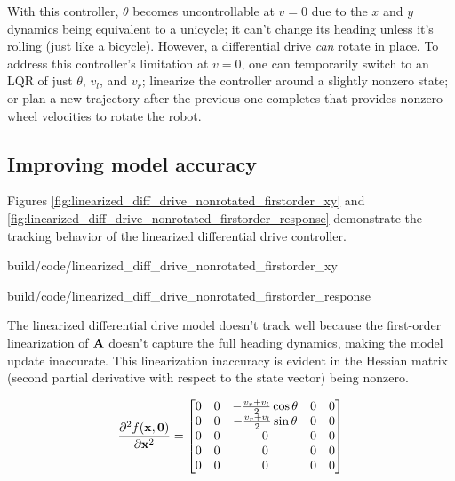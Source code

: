 With this \gls{controller}, $\theta$ becomes uncontrollable at $v = 0$ due to
the $x$ and $y$ dynamics being equivalent to a unicycle; it can't change its
heading unless it's rolling (just like a bicycle). However, a differential
drive \textit{can} rotate in place. To address this controller's limitation at
$v = 0$, one can temporarily switch to an LQR of just $\theta$, $v_l$, and
$v_r$; linearize the controller around a slightly nonzero state; or plan a new
trajectory after the previous one completes that provides nonzero wheel
velocities to rotate the robot.

\subsection{Improving model accuracy}

Figures \ref{fig:linearized_diff_drive_nonrotated_firstorder_xy} and
\ref{fig:linearized_diff_drive_nonrotated_firstorder_response} demonstrate the
tracking behavior of the linearized differential drive controller.

\begin{bookfigure}
  \begin{minisvg}{build/code/linearized_diff_drive_nonrotated_firstorder_xy}
    \caption{Linearized differential drive controller x-y plot (first order)}
    \label{fig:linearized_diff_drive_nonrotated_firstorder_xy}
  \end{minisvg}
  \hfill
  \begin{minisvg}{build/code/linearized_diff_drive_nonrotated_firstorder_response}
    \caption{Linearized differential drive controller response (first order)}
    \label{fig:linearized_diff_drive_nonrotated_firstorder_response}
  \end{minisvg}
\end{bookfigure}

The linearized differential drive model doesn't track well because the
first-order linearization of $\mathbf{A}$ doesn't capture the full heading
dynamics, making the \gls{model} update inaccurate. This linearization
inaccuracy is evident in the Hessian matrix (second partial derivative with
respect to the state vector) being nonzero.

\begin{equation*}
  \frac{\partial^2 f(\mathbf{x}, \mathbf{0})}{\partial\mathbf{x}^2} =
  \begin{bmatrix}
    0 & 0 & -\frac{v_r + v_l}{2}\cos\theta & 0 & 0 \\
    0 & 0 & -\frac{v_r + v_l}{2}\sin\theta & 0 & 0 \\
    0 & 0 & 0 & 0 & 0 \\
    0 & 0 & 0 & 0 & 0 \\
    0 & 0 & 0 & 0 & 0
  \end{bmatrix}
\end{equation*}

